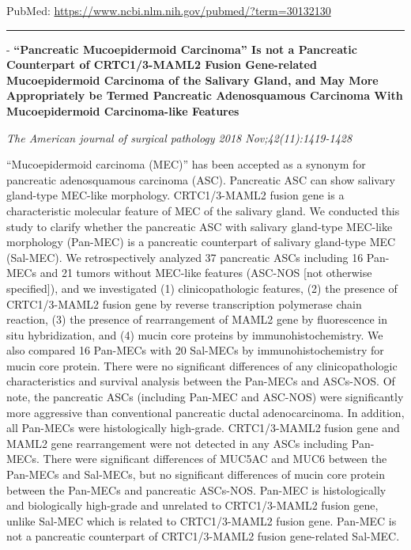 \documentclass[]{article}
\begin{document}
PubMed: \url{https://www.ncbi.nlm.nih.gov/pubmed/?term=30132130}

{}

{}

\begin{center}\rule{0.5\linewidth}{\linethickness}\end{center}

 - \textbf{``Pancreatic Mucoepidermoid Carcinoma'' Is not a Pancreatic
Counterpart of CRTC1/3-MAML2 Fusion Gene-related Mucoepidermoid
Carcinoma of the Salivary Gland, and May More Appropriately be Termed
Pancreatic Adenosquamous Carcinoma With Mucoepidermoid Carcinoma-like
Features}

\emph{The American journal of surgical pathology 2018
Nov;42(11):1419-1428}

``Mucoepidermoid carcinoma (MEC)'' has been accepted as a synonym for
pancreatic adenosquamous carcinoma (ASC). Pancreatic ASC can show
salivary gland-type MEC-like morphology. CRTC1/3-MAML2 fusion gene is a
characteristic molecular feature of MEC of the salivary gland. We
conducted this study to clarify whether the pancreatic ASC with salivary
gland-type MEC-like morphology (Pan-MEC) is a pancreatic counterpart of
salivary gland-type MEC (Sal-MEC). We retrospectively analyzed 37
pancreatic ASCs including 16 Pan-MECs and 21 tumors without MEC-like
features (ASC-NOS {[}not otherwise specified{]}), and we investigated
(1) clinicopathologic features, (2) the presence of CRTC1/3-MAML2 fusion
gene by reverse transcription polymerase chain reaction, (3) the
presence of rearrangement of MAML2 gene by fluorescence in situ
hybridization, and (4) mucin core proteins by immunohistochemistry. We
also compared 16 Pan-MECs with 20 Sal-MECs by immunohistochemistry for
mucin core protein. There were no significant differences of any
clinicopathologic characteristics and survival analysis between the
Pan-MECs and ASCs-NOS. Of note, the pancreatic ASCs (including Pan-MEC
and ASC-NOS) were significantly more aggressive than conventional
pancreatic ductal adenocarcinoma. In addition, all Pan-MECs were
histologically high-grade. CRTC1/3-MAML2 fusion gene and MAML2 gene
rearrangement were not detected in any ASCs including Pan-MECs. There
were significant differences of MUC5AC and MUC6 between the Pan-MECs and
Sal-MECs, but no significant differences of mucin core protein between
the Pan-MECs and pancreatic ASCs-NOS. Pan-MEC is histologically and
biologically high-grade and unrelated to CRTC1/3-MAML2 fusion gene,
unlike Sal-MEC which is related to CRTC1/3-MAML2 fusion gene. Pan-MEC is
not a pancreatic counterpart of CRTC1/3-MAML2 fusion gene-related
Sal-MEC.
\end{document}
